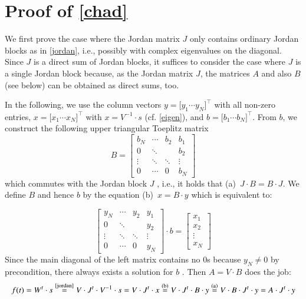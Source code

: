 \documentclass[preprint,12pt,times,authoryear]{elsarticle}%
\theoremstyle{definition}
\begin{document}
\section{Proof of \cref{chad}}\label{proof:chad}

We first prove the case where the Jordan matrix $J$ only contains ordinary
Jordan blocks as in \cref{jordan}, i.e., possibly with complex eigenvalues
on the diagonal. Since $J$ is a direct sum of Jordan blocks, it suffices to
consider the case where $J$ is a single Jordan block because, as the Jordan
matrix $J$, the matrices $A$ and also $B$ (see below) can be obtained as direct
sums, too.

In the following, we use the column vectors $y = \big[ y_1 \cdots y_N
\big]^\top$ with all non-zero entries, $x = \big[ x_1 \cdots x_N \big]^\top$
with $x = V^{-1} \cdot s$ (cf. \cref{eigen}), and $b = \big[ b_1 \cdots b_N
\big]^\top$. From $b$, we construct the following upper triangular Toeplitz
matrix
\[ B = \left[ \begin{array}{*{4}{c}}
  b_N & \cdots & b_2 & b_1\\
  0 & \ddots & & b_2\\
  \vdots & \ddots & \ddots & \vdots\\
  0 & \cdots & 0 & b_N
\end{array} \right] \]
which commutes with the Jordan block $J$ \cite[Sect.~3.2.4]{HJ13}, i.e., it
holds that (a)~$J \cdot B = B \cdot J$. We define $B$ and hence $b$ by the
equation (b)~$x = B \cdot y$ which is equivalent to:

\[ \left[ \begin{array}{*{4}{c}}
  y_N & \cdots & y_2 & y_1\\
  0 & \ddots & & y_2\\
  \vdots & \ddots & \ddots & \vdots\\
  0 & \cdots & 0 & y_N
\end{array} \right] \cdot b = \left[ \begin{array}{c}
  x_1\\[7pt] x_2\\ \vdots\\ x_N
\end{array} \right] \]
Since the main diagonal of the left matrix contains no $0$s because $y_N \neq 0$
by precondition, there always exists a solution for $b$ \cite[Sect.~0.9.3]{HJ13}.
Then $A = V \cdot B$ does the job:
\[ f(t) = W^t \cdot s
	\overset{\text{\cref{jordan}}}{=} V \cdot J^t \cdot V^{-1} \cdot s
	= V \cdot J^t \cdot x
	\overset{\text{(b)}}{=} V \cdot J^t \cdot B \cdot y
	\overset{\text{(a)}}{=} V \cdot B \cdot J^t \cdot y
	= A \cdot J^t \cdot y
\]
\end{document}
